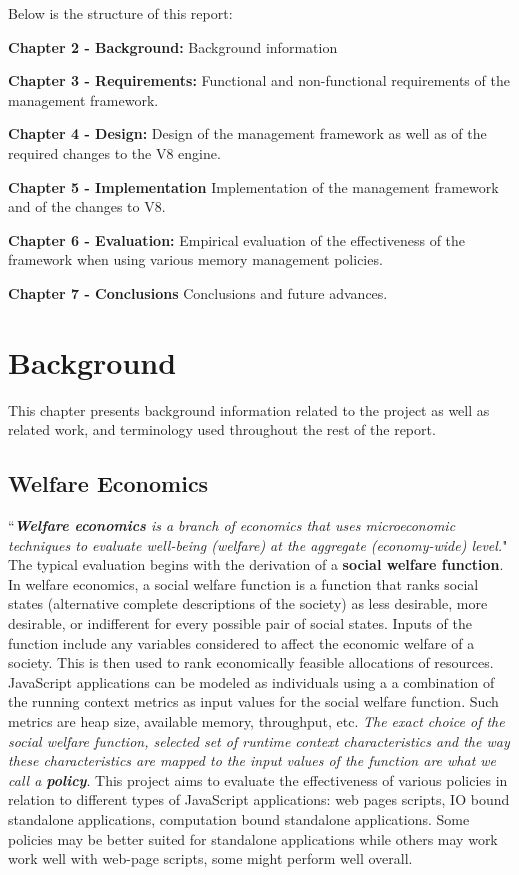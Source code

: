 \documentclass{l4proj}
\begin{document}
Below is the structure of this report:

\textbf{Chapter 2 - Background:}
Background information

\textbf{Chapter 3 - Requirements:}
Functional and non-functional requirements of the management framework.

\textbf{Chapter 4 - Design:}
Design of the management framework as well as of the required changes to the V8 engine.

\textbf{Chapter 5 - Implementation}
Implementation of the management framework and of the changes to V8.

\textbf{Chapter 6 - Evaluation:}
Empirical evaluation of the effectiveness of the framework when using various memory management policies.

\textbf{Chapter 7 - Conclusions}
Conclusions and future advances.


\chapter{Background}
\hspace*{3em} This chapter presents background information related to the project as well as related work, and terminology used throughout the rest of the report.
\section{Welfare Economics}
\hspace*{3em} ``\textit{\textbf{Welfare economics} is a branch of economics that uses microeconomic techniques to evaluate well-being (welfare) at the aggregate (economy-wide) level.}"\cite{welfareeconomics} The typical evaluation begins with the derivation of a \textbf{social welfare function}. In welfare economics, a social welfare function is a function that ranks social states (alternative complete descriptions of the society) as less desirable, more desirable, or indifferent for every possible pair of social states. Inputs of the function include any variables considered to affect the economic welfare of a society.\cite{socialwelfarefunction} This is then used to rank economically feasible allocations of resources. JavaScript applications can be modeled as individuals using a a combination of the running context metrics as input values for the social welfare function. Such metrics are heap size, available memory, throughput, etc. \textit{The exact choice of the social welfare function, selected set of runtime context characteristics and the way these characteristics are mapped to the input values of the function are what we call a \textbf{policy}}. This project aims to evaluate the effectiveness of various policies in relation to different types of JavaScript applications: web pages scripts, IO bound standalone applications, computation bound standalone applications. Some policies may be better suited for standalone applications while others may work work well with web-page scripts, some might perform well overall.%
\end{document}
